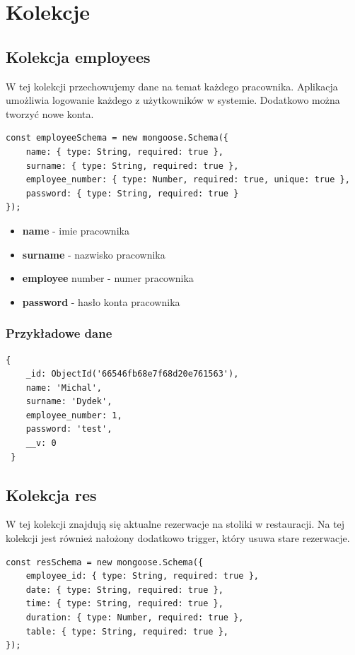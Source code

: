 \documentclass[12pt]{article}
\begin{document}
\section{Kolekcje}
\begin{samepage}
\subsection{Kolekcja employees}
W tej kolekcji przechowujemy dane na temat każdego pracownika. Aplikacja umożliwia logowanie każdego z użytkowników w systemie. Dodatkowo można tworzyć nowe konta.
\begin{lstlisting}[caption={Employees}]
const employeeSchema = new mongoose.Schema({
    name: { type: String, required: true },
    surname: { type: String, required: true },
    employee_number: { type: Number, required: true, unique: true },
    password: { type: String, required: true }
});
\end{lstlisting}
\end{samepage}

\begin{itemize}
	\item \textbf{name} - imie pracownika
	\item \textbf{surname} - nazwisko pracownika
	\item \textbf{employee} number - numer pracownika
	\item \textbf{password} - hasło konta pracownika
\end{itemize}

\subsubsection{Przykładowe dane}
\begin{lstlisting}[]
 {
    _id: ObjectId('66546fb68e7f68d20e761563'),
    name: 'Michal',
    surname: 'Dydek',
    employee_number: 1,
    password: 'test',
    __v: 0
 }
\end{lstlisting}


\newpage
\begin{samepage}
\subsection{Kolekcja res}
W tej kolekcji znajdują się aktualne rezerwacje na stoliki w restauracji. Na tej kolekcji jest również nałożony dodatkowo trigger, który usuwa stare rezerwacje.

\begin{lstlisting}[caption={Reservations}]
const resSchema = new mongoose.Schema({
    employee_id: { type: String, required: true },
    date: { type: String, required: true },
    time: { type: String, required: true },
    duration: { type: Number, required: true },
    table: { type: String, required: true },
});
\end{lstlisting}
\end{samepage}
\end{document}
